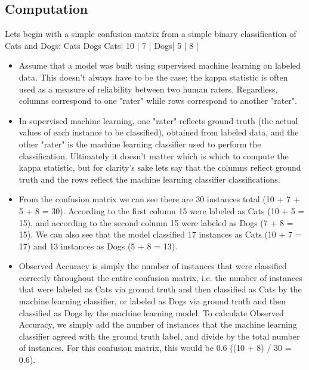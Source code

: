 \documentclass[caret-main.tex]{subfiles}
\begin{document}
\subsection{Computation}
Lets begin with a simple confusion matrix from a simple binary classification of Cats and Dogs:
     Cats Dogs
Cats| 10 | 7  |
Dogs| 5  | 8  |
\begin{itemize}
\item Assume that a model was built using supervised machine learning on labeled data. This doesn't always have to be the case; the kappa statistic is often used as a measure of reliability between two human raters. Regardless, columns correspond to one "rater" while rows correspond to another "rater". 

\item In supervised machine learning, one "rater" reflects ground truth (the actual values of each instance to be classified), obtained from labeled data, and the other "rater" is the machine learning classifier used to perform the classification. Ultimately it doesn't matter which is which to compute the kappa statistic, but for clarity's sake lets say that the columns reflect ground truth and the rows reflect the machine learning classifier classifications.

\item From the confusion matrix we can see there are 30 instances total (10 + 7 + 5 + 8 = 30). According to the first column 15 were labeled as Cats (10 + 5 = 15), and according to the second column 15 were labeled as Dogs (7 + 8 = 15). We can also see that the model classified 17 instances as Cats (10 + 7 = 17) and 13 instances as Dogs (5 + 8 = 13).

\item Observed Accuracy is simply the number of instances that were classified correctly throughout the entire confusion matrix, i.e. the number of instances that were labeled as Cats via ground truth and then classified as Cats by the machine learning classifier, or labeled as Dogs via ground truth and then classified as Dogs by the machine learning model. To calculate Observed Accuracy, we simply add the number of instances that the machine learning classifier agreed with the ground truth label, and divide by the total number of instances. For this confusion matrix, this would be 0.6 ((10 + 8) / 30 = 0.6).


\end{itemize}
\end{document}
